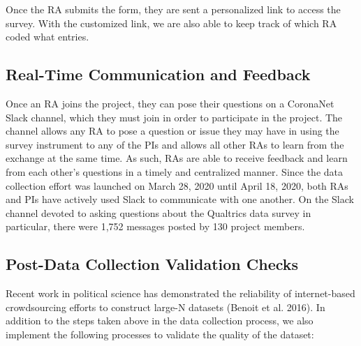 \documentclass[]{article}
\begin{document}
Once the RA submits the form, they are sent a personalized link to access the survey. With the customized link, we are also able to keep track of which RA coded what entries.

\hypertarget{real-time-communication-and-feedback}{%
\subsection{Real-Time Communication and Feedback}\label{real-time-communication-and-feedback}}

Once an RA joins the project, they can pose their questions on a CoronaNet Slack channel, which they must join in order to participate in the project. The channel allows any RA to pose a question or issue they may have in using the survey instrument to any of the PIs and allows all other RAs to learn from the exchange at the same time. As such, RAs are able to receive feedback and learn from each other's questions in a timely and centralized manner. Since the data collection effort was launched on March 28, 2020 until April 18, 2020, both RAs and PIs have actively used Slack to communicate with one another. On the Slack channel devoted to asking questions about the Qualtrics data survey in particular, there were 1,752 messages posted by 130 project members.

\hypertarget{post-data-collection-validation-checks}{%
\subsection{Post-Data Collection Validation Checks}\label{post-data-collection-validation-checks}}

Recent work in political science has demonstrated the reliability of internet-based crowdsourcing efforts to construct large-N datasets (Benoit et al. 2016). In addition to the steps taken above in the data collection process, we also implement the following processes to validate the quality of the dataset:
\end{document}
